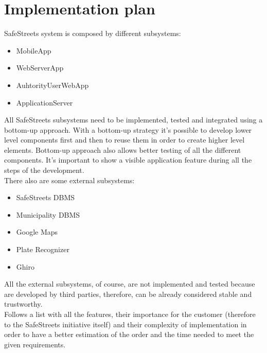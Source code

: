     \section{Implementation plan}
    SafeStreets system is composed by different subsystems:
    \begin{itemize}
        \item MobileApp
        \item WebServerApp
        \item AuhtorityUserWebApp
        \item ApplicationServer
    \end{itemize}   
    All SafeStreets subsystems need to be implemented, tested and integrated
    using a bottom-up approach. With a bottom-up strategy it's possible to
    develop lower level components first and then to reuse them in order to
    create higher level elements. Bottom-up approach also allows better testing
    of all the different components. It's important to show a visible
    application feature during all the steps of the development.\\
    There also are some external subsystems: 
    \begin{itemize}
        \item SafeStreets DBMS
        \item Municipality DBMS
        \item Google Maps
        \item Plate Recognizer
        \item Ghiro
    \end{itemize}   
    All the external subsystems, of course, are not implemented and tested
    because are developed by third parties, therefore, can be already considered
    stable and trustworthy.\\
    Follows a list with all the features, their importance for the customer
    (therefore to the SafeStreets initiative itself) and their complexity of
    implementation in order to have a better estimation of the order and the
    time needed to meet the given requirements.
